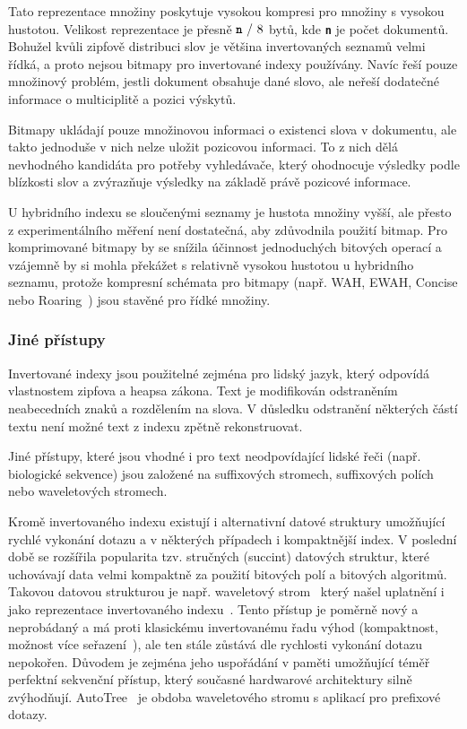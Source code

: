 \documentclass[11pt,letterpaper,oneside,openright]{book}
\newcommand{\bftt}[1]{\texttt{\textbf{#1}}}
\begin{document}
Tato reprezentace množiny poskytuje vysokou kompresi pro množiny s vysokou
hustotou. Velikost reprezentace je přesně $\bftt{n}\ /\ 8$ bytů, kde \bftt{n}
je počet dokumentů. Bohužel kvůli zipfově distribuci slov je většina
invertovaných seznamů velmi řídká, a proto nejsou bitmapy pro invertované
indexy používány. Navíc řeší pouze množinový problém, jestli dokument obsahuje
dané slovo, ale neřeší dodatečné informace o multiciplitě a pozici výskytů.

Bitmapy ukládají pouze množinovou informaci o existenci slova v dokumentu, ale
takto jednoduše v nich nelze uložit pozicovou informaci. To z nich dělá
nevhodného kandidáta pro potřeby vyhledávače, který ohodnocuje výsledky podle
blízkosti slov a zvýrazňuje výsledky na základě právě pozicové informace.

U hybridního indexu se sloučenými seznamy je hustota množiny vyšší, ale přesto
z experimentálního měření není dostatečná, aby zdůvodnila použití bitmap. Pro
komprimované bitmapy by se snížila účinnost jednoduchých bitových operací a
vzájemně by si mohla překážet s relativně vysokou hustotou u hybridního
seznamu, protože kompresní schémata pro bitmapy (např. WAH, EWAH, Concise nebo
Roaring~\cite{DBLP:journals/corr/LemireKK16}) jsou stavěné pro řídké množiny.


\subsubsection{Jiné přístupy}
Invertované indexy jsou použitelné zejména pro lidský jazyk, který odpovídá
vlastnostem zipfova a heapsa zákona. Text je modifikován odstraněním
neabecedních znaků a rozdělením na slova. V důsledku odstranění některých částí
textu není možné text z indexu zpětně rekonstruovat.

Jiné přístupy, které jsou vhodné i pro text neodpovídající lidské řeči (např.
biologické sekvence) jsou založené na suffixových stromech, suffixových polích
nebo waveletových stromech.


Kromě invertovaného indexu existují i alternativní datové struktury umožňující
rychlé vykonání dotazu a v některých případech i kompaktnější index. V poslední
době se rozšířila popularita tzv. stručných (succint) datových struktur, které
uchovávají data velmi kompaktně za použití bitových polí a bitových algoritmů.
Takovou datovou strukturou je např. waveletový
strom~\cite{Grossi:2003:HET:644108.644250} který našel uplatnění i jako
reprezentace invertovaného
indexu~\cite{Ferragina:2007:CRS:1240233.1240243,FERRAGINA2009849}. Tento
přístup je poměrně nový a neprobádaný a má proti klasickému invertovanému řadu
výhod (kompaktnost, možnost více seřazení~\cite{Navarro2010}), ale ten stále
zůstává dle rychlosti vykonání dotazu nepokořen.  Důvodem je zejména jeho
uspořádání v paměti umožňující téměř perfektní sekvenční přístup, který
současné hardwarové architektury silně zvýhodňují. AutoTree~\cite{Weber2007} je
obdoba waveletového stromu s aplikací pro prefixové dotazy.
\end{document}

